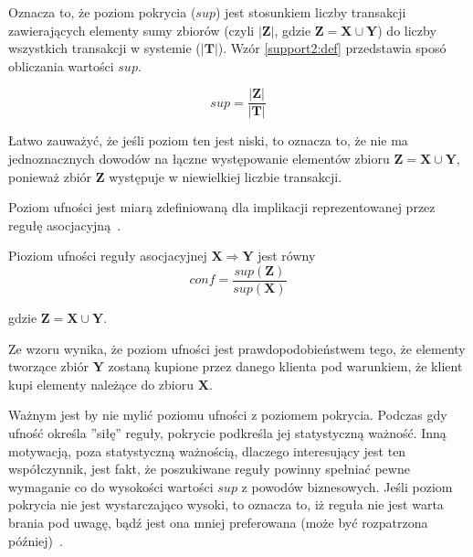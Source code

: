 Oznacza to, że poziom pokrycia ($sup$) jest stosunkiem liczby transakcji zawierających elementy sumy zbiorów (czyli $|\mathbf{Z}|$, gdzie $\mathbf{Z} = \mathbf{X} \cup \mathbf{Y}$) do liczby wszystkich transakcji w systemie ($|\mathbf{T}|$). Wzór \ref{support2:def} przedstawia sposó obliczania wartości $sup$.

\begin{equation}\label{support2:def}
	sup = \frac{|\mathbf{Z}|}{|\mathbf{T}|}
\end{equation}

Łatwo zauważyć, że jeśli poziom ten jest niski, to oznacza to, że nie ma jednoznacznych dowodów na łączne występowanie elementów zbioru $\mathbf{Z} = \mathbf{X} \cup \mathbf{Y}$, ponieważ zbiór $\mathbf{Z}$ występuje w niewielkiej liczbie transakcji. 

Poziom ufności jest miarą zdefiniowaną dla implikacji reprezentowanej przez regułę asocjacyjną~\cite{Elmasri:db}. 

\begin{df}\label{confidence:def}
Pioziom ufności reguły asocjacyjnej $\mathbf{X} \Rightarrow \mathbf{Y}$ jest równy 
\begin{equation}
	conf = \frac{sup(\mathbf{Z})}{sup(\mathbf{X})}
\end{equation}

gdzie $\mathbf{Z} = \mathbf{X} \cup \mathbf{Y}$.
\end{df}

Ze wzoru wynika, że poziom ufności jest prawdopodobieństwem tego, że elementy tworzące zbiór $\mathbf{Y}$ zostaną kupione przez danego klienta pod warunkiem, że klient kupi elementy należące do zbioru $\mathbf{X}$.

Ważnym jest by nie mylić poziomu ufności z poziomem pokrycia. Podczas gdy ufność określa ''siłę'' reguły, pokrycie podkreśla jej statystyczną ważność. Inną motywacją, poza statystyczną ważnością, dlaczego interesujący jest ten współczynnik, jest fakt, że poszukiwane reguły powinny spełniać pewne wymaganie co do wysokości wartości $sup$ z powodów biznesowych. Jeśli poziom pokrycia nie jest wystarczająco wysoki, to oznacza to, iż reguła nie jest warta brania pod uwagę, bądź jest ona mniej preferowana (może być rozpatrzona później)~\cite{Problem:Statement}.